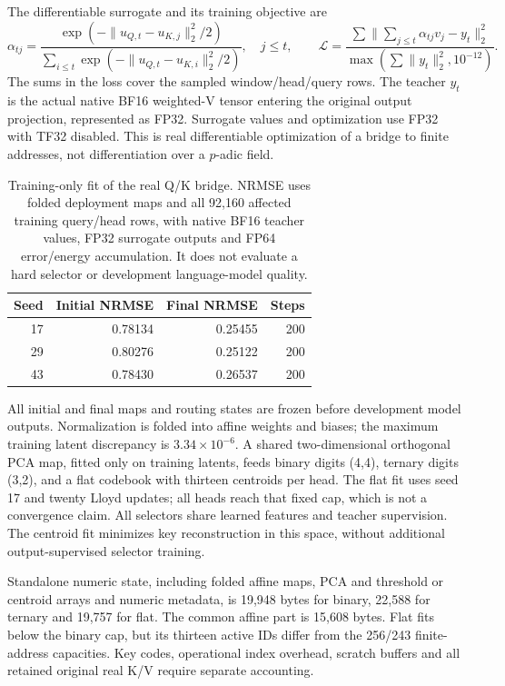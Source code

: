 \documentclass[11pt]{article}
\begin{document}
The differentiable surrogate and its training objective are
\[
 \alpha_{tj}=\frac{\exp(-\|u_{Q,t}-u_{K,j}\|_2^2/2)}
 {\sum_{i\leq t}\exp(-\|u_{Q,t}-u_{K,i}\|_2^2/2)},\quad j\leq t,
 \qquad
 \mathcal L=\frac{\sum\|\sum_{j\leq t}\alpha_{tj}v_j-y_t\|_2^2}
 {\max(\sum\|y_t\|_2^2,10^{-12})}.
\]
The sums in the loss cover the sampled window/head/query rows. The teacher
\(y_t\) is the actual native BF16 weighted-V tensor entering the original
output projection, represented as FP32. Surrogate values and optimization
use FP32 with TF32 disabled. This is real differentiable optimization of a
bridge to finite addresses, not differentiation over a \(p\)-adic field.

\begin{table}[htbp]
\centering\small
\caption{Training-only fit of the real Q/K bridge. NRMSE uses folded deployment
maps and all 92,160 affected training query/head rows, with native BF16 teacher
values, FP32 surrogate outputs and FP64 error/energy accumulation.
It does not evaluate a hard selector or development language-model quality.}
\begin{tabular}{rrrr}
\toprule
Seed & Initial NRMSE & Final NRMSE & Steps\\
\midrule
17 & 0.78134 & 0.25455 & 200\\
29 & 0.80276 & 0.25122 & 200\\
43 & 0.78430 & 0.26537 & 200\\
\bottomrule
\end{tabular}
\label{tab:learned-training}
\end{table}

All initial and final maps and routing states are frozen before development
model outputs. Normalization is folded into affine weights and biases; the
maximum training latent discrepancy is \(3.34\times10^{-6}\). A shared
two-dimensional orthogonal PCA map, fitted only on training latents, feeds
binary digits (4,4), ternary digits (3,2), and a flat codebook with thirteen
centroids per head. The flat fit uses seed 17 and twenty Lloyd updates;
all heads reach that fixed cap, which is not a convergence claim.
All selectors share learned features and teacher supervision. The centroid
fit minimizes key reconstruction in this space, without additional
output-supervised selector training.

Standalone numeric state, including folded affine maps, PCA and threshold or
centroid arrays and numeric metadata, is 19,948 bytes for binary,
22,588 for ternary and 19,757 for flat. The common affine part is 15,608 bytes.
Flat fits below the binary cap, but its thirteen active IDs differ from the
256/243 finite-address capacities. Key codes, operational index overhead,
scratch buffers and all retained original real K/V require separate accounting.
\end{document}

